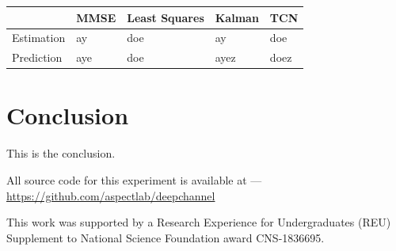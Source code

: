 \documentclass[twocolumn,letterpaper]{IEEEAerospaceCLS}  %
\begin{document}
\begin{table}[!h]
\begin{tabular}{|l|l|l|l|l|}
\hline
                            & MMSE                 & Least Squares        & Kalman         & TCN                   \\ \hline
\multirow{3}{*}{Estimation} & \multirow{3}{*}{ay}  & \multirow{3}{*}{doe} & \multirow{3}{*}{ay}   & \multirow{3}{*}{doe}  \\
                            &                      &                      &                       &                       \\
                            &                      &                      &                       &                       \\ \hline
\multirow{3}{*}{Prediction} & \multirow{3}{*}{aye} & \multirow{3}{*}{doe} & \multirow{3}{*}{ayez} & \multirow{3}{*}{doez} \\
                            &                      &                      &                       &                       \\
                            &                      &                      &                       &                       \\ \hline
\end{tabular}
\end{table}


\section{Conclusion}
\label{sec:conclusion}
This is the conclusion.



All source code for this experiment is available at ---\\
\url{https://github.com/aspectlab/deepchannel}




\acknowledgments
This work was supported by a Research Experience for Undergraduates
(REU) Supplement to National Science Foundation award CNS-1836695.
\end{document}
